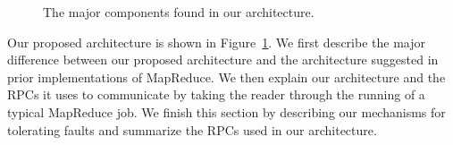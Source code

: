 \documentclass[10pt,letter,final,article,twocolumn]{article} %
\begin{document}
\begin{figure}[htbp]
\begin{center}
\caption{The major components found in our architecture.}
\label{fig:arch}
\end{center}
\end{figure}


Our proposed architecture is shown in Figure~\ref{fig:arch}. We first describe the major difference between our proposed architecture and the architecture suggested in prior implementations of MapReduce. We then explain our architecture and the RPCs it uses to communicate by taking the reader through the running of a typical MapReduce job. We finish this section by describing our mechanisms for tolerating faults and summarize the RPCs used in our architecture.
\end{document}
